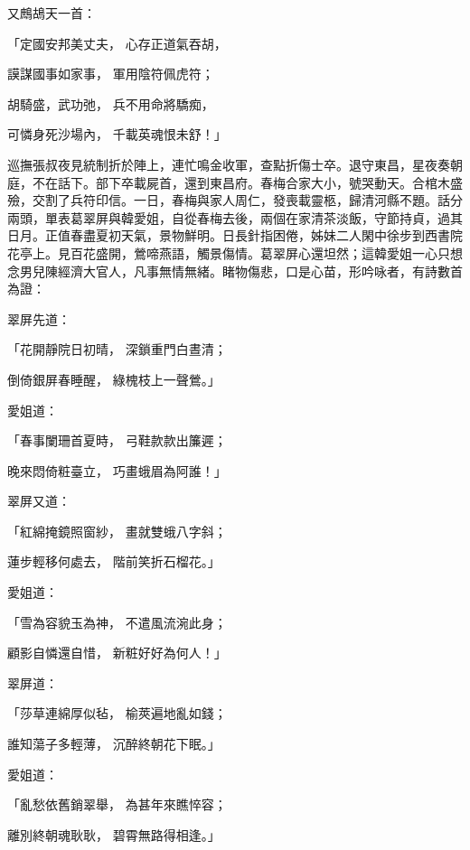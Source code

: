 \begin{showcontents}{}
又鷓鴣天一首：

「定國安邦美丈夫，  心存正道氣吞胡，

謨謀國事如家事，  軍用陰符佩虎符；

胡騎盛，武功弛，  兵不用命將驕痴，

可憐身死沙場內，  千載英魂恨未舒！」

巡撫張叔夜見統制折於陣上，連忙鳴金收軍，查點折傷士卒。退守東昌，星夜奏朝庭，不在話下。部下卒載屍首，還到東昌府。春梅合家大小，號哭動天。合棺木盛殮，交割了兵符印信。一日，春梅與家人周仁，發喪載靈柩，歸清河縣不題。話分兩頭，單表葛翠屏與韓愛姐，自從春梅去後，兩個在家清茶淡飯，守節持貞，過其日月。正值春盡夏初天氣，景物鮮明。日長針指困倦，姊妹二人閑中徐步到西書院花亭上。見百花盛開，鶯啼燕語，觸景傷情。葛翠屏心還坦然；這韓愛姐一心只想念男兒陳經濟大官人，凡事無情無緒。睹物傷悲，口是心苗，形吟咏者，有詩數首為證：

翠屏先道：

「花開靜院日初晴，  深鎖重門白晝清；

倒倚銀屏春睡醒，  綠槐枝上一聲鶯。」

愛姐道：

「春事闌珊首夏時，  弓鞋款款出簾遲；

晚來悶倚粧臺立，  巧畫蛾眉為阿誰！」

翠屏又道：

「紅綿掩鏡照窗紗，  畫就雙蛾八字斜；

蓮步輕移何處去，  階前笑折石榴花。」

愛姐道：

「雪為容貌玉為神，  不遣風流涴此身；

顧影自憐還自惜，  新粧好好為何人！」

翠屏道：

「莎草連綿厚似毡，  榆莢遍地亂如錢；

誰知蕩子多輕薄，  沉醉終朝花下眠。」

愛姐道：

「亂愁依舊銷翠舉，  為甚年來瞧悴容；

離別終朝魂耿耿，  碧霄無路得相逢。」


\end{showcontents}
